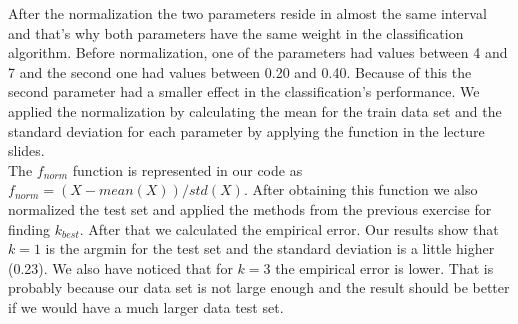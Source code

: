 \documentclass{article}      %
\begin{document}
After the normalization the two parameters reside in almost the same interval and that's why both parameters have the same weight in the classification algorithm. Before normalization, one of the parameters had values between 4 and 7 and the second one had values between 0.20 and 0.40. Because of this the second parameter had a smaller effect in the classification's performance. We applied the normalization by calculating the mean for the train data set and the standard deviation for each parameter by applying the function in the lecture slides.\\

The $f_{norm}$ function is represented in our code as $f_{norm} = (X -mean(X)) / std(X)$. After obtaining this function we also normalized the test set and applied the methods from the previous exercise for finding $k_{best}$. After that we calculated the empirical error. Our results show that $k = 1$ is the argmin for the test set and the standard deviation is a little higher (0.23). We also have noticed that for $k = 3$ the empirical error is lower. That is probably because our data set is not large enough and the result should be better if we would have a much larger data test set.\\
\end{document}
